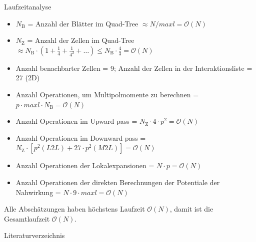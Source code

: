 \documentclass[ngerman]{beamer}
\begin{document}
\begin{frame}{Laufzeitanalyse}
\begin{Beweis}
\footnotesize
\begin{itemize}
\item $N_\text{B}$ = Anzahl der Blätter im Quad-Tree $\approx N/maxl = \mathcal{O}(N)$
\item $N_\text{Z}$ = Anzahl der Zellen im Quad-Tree $\approx N_\text{B}\cdot(1+\frac{1}{4} + \frac{1}{4^2} + \ldots) \leq N_\text{B} \cdot \frac{4}{3} = \mathcal{O}(N)$
\item Anzahl benachbarter Zellen = 9; Anzahl der Zellen in der Interaktionsliste = 27 (2D)
\item Anzahl Operationen, um Multipolmomente zu berechnen = $p\cdot maxl \cdot N_\text{B} = \mathcal{O}(N)$
\item Anzahl Operationen im Upward pass = $N_\text{Z}\cdot 4 \cdot p^2 = \mathcal{O}(N)$
\item Anzahl Operationen im Downward pass = $N_\text{Z}\cdot \left[p^2 (L2L) + 27 \cdot p^2(M2L) \right] = \mathcal{O}(N)$
\item Anzahl Operationen der Lokalexpansionen = $N \cdot p = \mathcal{O}(N)$
\item Anzahl Operationen der direkten Berechnungen der Potentiale der Nahwirkung = $N\cdot 9\cdot maxl = \mathcal{O}(N)$
\end{itemize}
Alle Abschätzungen haben höchstens Laufzeit $\mathcal{O}(N)$, damit ist die Gesamtlaufzeit $\mathcal{O}(N)$.
\end{Beweis}
\end{frame}

\begin{frame}{Literaturverzeichnis}
\nocite{*}


\end{frame}
\end{document}

